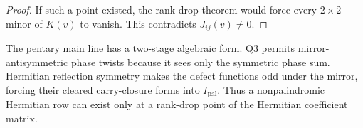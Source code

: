 \begin{proof}
If such a point existed, the rank-drop theorem would force every
$2\times2$ minor of $K(v)$ to vanish. This contradicts
$J_{ij}(v)\ne0$.
\end{proof}

\begin{principle}
\label{prin:innovation-input-mirror-decomposition-main-line}
The pentary main line has a two-stage algebraic form. Q3 permits
mirror-antisymmetric phase twists because it sees only the symmetric
phase sum. Hermitian reflection symmetry makes the defect functions odd
under the mirror, forcing their cleared carry-closure forms into
$I_{\mathrm{pal}}$. Thus a nonpalindromic Hermitian row can exist only at
a rank-drop point of the Hermitian coefficient matrix.
\end{principle}

